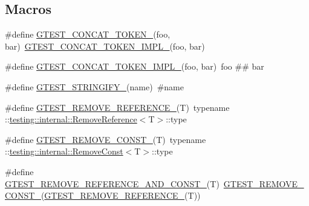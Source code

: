 \subsection*{Macros}
\begin{DoxyCompactItemize}
\item 
\#define \mbox{\hyperlink{_obj__test_2lib_2googletest-master_2googletest_2include_2gtest_2internal_2gtest-internal_8h_ae3c336cbe1ae2bd1b1d019333e4428a0}{G\+T\+E\+S\+T\+\_\+\+C\+O\+N\+C\+A\+T\+\_\+\+T\+O\+K\+E\+N\+\_\+}}(foo,  bar)~\mbox{\hyperlink{_obj__test_2lib_2googletest-release-1_88_81_2googletest_2include_2gtest_2internal_2gtest-internal_8h_aa39fb5346d3573feebe4257cb3a01fde}{G\+T\+E\+S\+T\+\_\+\+C\+O\+N\+C\+A\+T\+\_\+\+T\+O\+K\+E\+N\+\_\+\+I\+M\+P\+L\+\_\+}}(foo, bar)
\item 
\#define \mbox{\hyperlink{_obj__test_2lib_2googletest-master_2googletest_2include_2gtest_2internal_2gtest-internal_8h_aa39fb5346d3573feebe4257cb3a01fde}{G\+T\+E\+S\+T\+\_\+\+C\+O\+N\+C\+A\+T\+\_\+\+T\+O\+K\+E\+N\+\_\+\+I\+M\+P\+L\+\_\+}}(foo,  bar)~foo \#\# bar
\item 
\#define \mbox{\hyperlink{_obj__test_2lib_2googletest-master_2googletest_2include_2gtest_2internal_2gtest-internal_8h_affa935d4361fa573644e9c739dde2b14}{G\+T\+E\+S\+T\+\_\+\+S\+T\+R\+I\+N\+G\+I\+F\+Y\+\_\+}}(name)~\#name
\item 
\#define \mbox{\hyperlink{_obj__test_2lib_2googletest-master_2googletest_2include_2gtest_2internal_2gtest-internal_8h_a84c72f25a6a6600e3ff8381ca6982ae9}{G\+T\+E\+S\+T\+\_\+\+R\+E\+M\+O\+V\+E\+\_\+\+R\+E\+F\+E\+R\+E\+N\+C\+E\+\_\+}}(T)~typename \+::\mbox{\hyperlink{structtesting_1_1internal_1_1_remove_reference}{testing\+::internal\+::\+Remove\+Reference}}$<$T$>$\+::type
\item 
\#define \mbox{\hyperlink{_obj__test_2lib_2googletest-master_2googletest_2include_2gtest_2internal_2gtest-internal_8h_a2ffec8c60510eb130af387f5ce9a756a}{G\+T\+E\+S\+T\+\_\+\+R\+E\+M\+O\+V\+E\+\_\+\+C\+O\+N\+S\+T\+\_\+}}(T)~typename \+::\mbox{\hyperlink{structtesting_1_1internal_1_1_remove_const}{testing\+::internal\+::\+Remove\+Const}}$<$T$>$\+::type
\item 
\#define \mbox{\hyperlink{_obj__test_2lib_2googletest-master_2googletest_2include_2gtest_2internal_2gtest-internal_8h_a874567b176266188fabfffb8393267ce}{G\+T\+E\+S\+T\+\_\+\+R\+E\+M\+O\+V\+E\+\_\+\+R\+E\+F\+E\+R\+E\+N\+C\+E\+\_\+\+A\+N\+D\+\_\+\+C\+O\+N\+S\+T\+\_\+}}(T)~\mbox{\hyperlink{_obj__test_2lib_2googletest-release-1_88_81_2googletest_2include_2gtest_2internal_2gtest-internal_8h_a2ffec8c60510eb130af387f5ce9a756a}{G\+T\+E\+S\+T\+\_\+\+R\+E\+M\+O\+V\+E\+\_\+\+C\+O\+N\+S\+T\+\_\+}}(\mbox{\hyperlink{_obj__test_2lib_2googletest-release-1_88_81_2googletest_2include_2gtest_2internal_2gtest-internal_8h_a84c72f25a6a6600e3ff8381ca6982ae9}{G\+T\+E\+S\+T\+\_\+\+R\+E\+M\+O\+V\+E\+\_\+\+R\+E\+F\+E\+R\+E\+N\+C\+E\+\_\+}}(T))

\end{DoxyCompactItemize}
